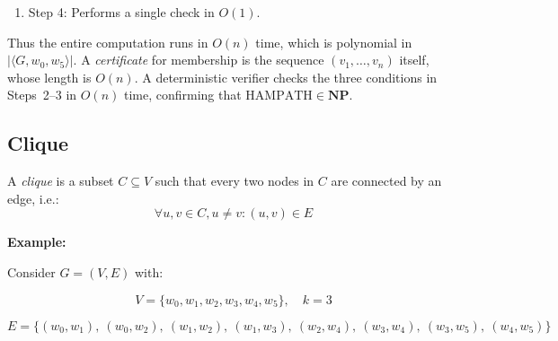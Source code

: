 \documentclass[12pt,a4paper,openany]{article}
\begin{document}
\begin{enumerate}
    \item Step 4: Performs a single check in $O(1)$.

\begin{center}
\end{center}

\end{enumerate}

Thus the entire computation runs in $O(n)$ time, which is polynomial in $|\langle G, w_0, w_5 \rangle|$.
A \emph{certificate} for membership is the sequence $(v_1, \ldots, v_n)$ itself, whose length is $O(n)$. A deterministic verifier checks the three conditions in Steps~2--3 in $O(n)$ time, confirming that $\text{HAMPATH} \in \mathbf{NP}$.

\subsection{Clique}

A \emph{clique} is a subset $C \subseteq V$ such that every two nodes in $C$ are connected by an edge, i.e.:
\[
\forall u, v \in C, u \neq v : (u, v) \in E
\]

\textbf{Example: }

Consider $G = (V, E)$ with:

\begin{center}
\end{center}

\[
V = \{w_0, w_1, w_2, w_3, w_4, w_5\}, \quad k = 3
\]

\[
E = \{(w_0,w_1),\ (w_0,w_2),\ (w_1,w_2),\ (w_1,w_3),\ (w_2,w_4),\ (w_3,w_4),\ (w_3,w_5),\ (w_4,w_5)\}
\]
\end{document}
